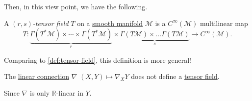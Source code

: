 Then, in this view point, we have the following.

\begin{definition}\label{def:tensor-field*}
	A \emph{\((r, s)\)-tensor field} \(T\) on a \hyperref[def:smooth-manifold]{smooth manifold} \(\mathcal{M} \) is a \(C^{\infty} (\mathcal{M} )\) multilinear map
	\[
		T \colon \underbrace{\Gamma (T ^{\ast} \mathcal{M} ) \times \cdots \times \Gamma (T ^{\ast} \mathcal{M} )}_{r} \times \underbrace{\Gamma (T \mathcal{M} ) \times \ldots \Gamma (T \mathcal{M} )}_{s} \to C^{\infty} (\mathcal{M} ).
	\]
\end{definition}

Comparing to \autoref{def:tensor-field}, this definition is more general!

\begin{eg}
	The \hyperref[def:linear-connection]{linear connection} \(\nabla \) \((X, Y) \mapsto \nabla _X Y\) does not define a \hyperref[def:tensor-field*]{tensor field}.
\end{eg}
\begin{explanation}
	Since \(\nabla \) is only \(\mathbb{R} \)-linear in \(Y\).
\end{explanation}
